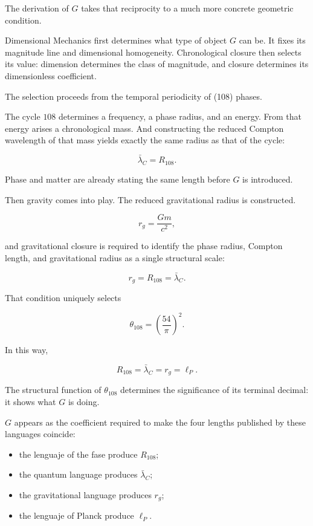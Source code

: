 The derivation of \(G\) takes that reciprocity to a much more concrete geometric condition.\par

Dimensional Mechanics first determines what type of object \(G\) can be. It fixes its magnitude line and dimensional homogeneity. Chronological closure then selects its value: dimension determines the class of magnitude, and closure determines its dimensionless coefficient.\par

The selection proceeds from the temporal periodicity of (108) phases.\par

The cycle \(108\) determines a frequency, a phase radius, and an energy. From that energy arises a chronological mass. And constructing the reduced Compton wavelength of that mass yields exactly the same radius as that of the cycle:\par

\[
\bar\lambda_C=R_{108}.
\]

Phase and matter are already stating the same length before \(G\) is introduced.\par

Then gravity comes into play. The reduced gravitational radius is constructed.\par

\[
r_g=\frac{Gm}{c^2},
\]

and gravitational closure is required to identify the phase radius, Compton
length, and gravitational radius as a single structural scale:\par

\[
r_g=R_{108}=\bar\lambda_C.
\]

That condition uniquely selects\par

\[
\theta_{108}
=
\left(\frac{54}{\pi}\right)^2.
\]

In this way,\par

\[
R_{108}
=
\bar\lambda_C
=
r_g
=
\ell_P.
\]

The structural function of \(\theta_{108}\) determines the significance of its terminal decimal: it shows what \(G\) is doing.\par

\(G\) appears as the coefficient required to make the four lengths published by these languages coincide:\par

\begin{itemize}[leftmargin=*,itemsep=0.35em]
\item the lenguaje of the fase produce \(R_{108}\);
\item the quantum language produces \(\bar\lambda_C\);
\item the gravitational language produces \(r_g\);
\item the lenguaje of Planck produce \(\ell_P\).
\end{itemize}

